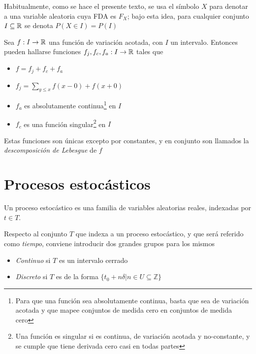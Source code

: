 Habitualmente, como se hace el presente texto, se usa el símbolo $X$ para denotar a una variable 
aleatoria cuya FDA es $F_X$; bajo esta idea, para cualquier conjunto $I \subseteq \mathbb{R}$ se denota
$P(X \in I) = P(I)$



\begin{teorema}
Sea $f:I\rightarrow \mathbb{R}$ una funci\'on de variaci\'on acotada, con $I$ un intervalo. Entonces pueden 
hallarse funciones $f_j, f_c, f_a :I\rightarrow \mathbb{R}$ tales que
\begin{itemize}
\item $f = f_j+ f_c+ f_a$
\item $f_j = \sum_{y \leq x} f(x-0) + f(x+0)$
\item $f_a$ es absolutamente continua\footnote{Para que una funci\'on sea absolutamente continua,
basta que sea de variaci\'on acotada y que mapee conjuntos de medida cero en conjuntos de medida
cero} en $I$
\item $f_c$ es una funci\'on singular\footnote{Una funci\'on es singular si es continua, de 
variaci\'on acotada y no-constante, y se cumple que tiene derivada cero casi en todas partes} en 
$I$
\end{itemize}
Estas funciones son \'unicas excepto por constantes, y en conjunto son llamados la 
\textit{descomposici\'on de Lebesgue} de $f$
\label{Lebesgue_decomp}
\end{teorema}


\section{Procesos estocásticos}

\begin{definicion}
Un proceso estocástico \xt es una familia de variables aleatorias reales, 
indexadas por $t \in T$.
\label{proc_estocastico}
\end{definicion}

Respecto al conjunto $T$ que indexa a un proceso estocástico, y que será referido como 
\textit{tiempo}, conviene introducir dos grandes grupos para los mismos
\begin{itemize}
\item \textit{Continuo} si $T$ es un intervalo cerrado
\item \textit{Discreto} si $T$ es de la forma 
$\{ t_0 + n \delta \lvert n \in U \subseteq \mathbb{Z} \}$
\end{itemize}

